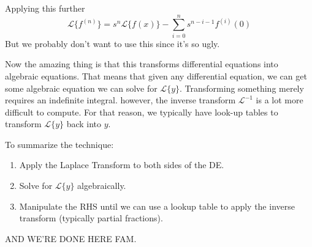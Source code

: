 \documentclass[11pt]{article}
\begin{document}
Applying this further
\[ \mathscr{L}\{f^{(n)}\} = s^n\mathscr{L}\{f(x)\} - \sum_{i=0}^{n} s^{n-i-1}f^{(i)}(0) \]
But we probably don't want to use this since it's so ugly.

Now the amazing thing is that this transforms differential equations into algebraic equations. That means that
given any differential equation, we can get some algebraic equation we can solve for $\mathscr{L}\{y\}$. 
Transforming something merely requires an indefinite integral. however, the inverse transform $\mathscr{L}^{-1}$
is a lot more difficult to compute. For that reason, we typically have look-up tables to transform 
$\mathscr{L}\{y\}$ back into $y$.

To summarize the technique:
\begin{enumerate}
    \item Apply the Laplace Transform to both sides of the DE.
    \item Solve for $\mathscr{L}\{y\}$ algebraically.
    \item Manipulate the RHS until we can use a lookup table to apply the inverse transform (typically partial
          fractions).
\end{enumerate}
AND WE'RE DONE HERE FAM.
\end{document}
